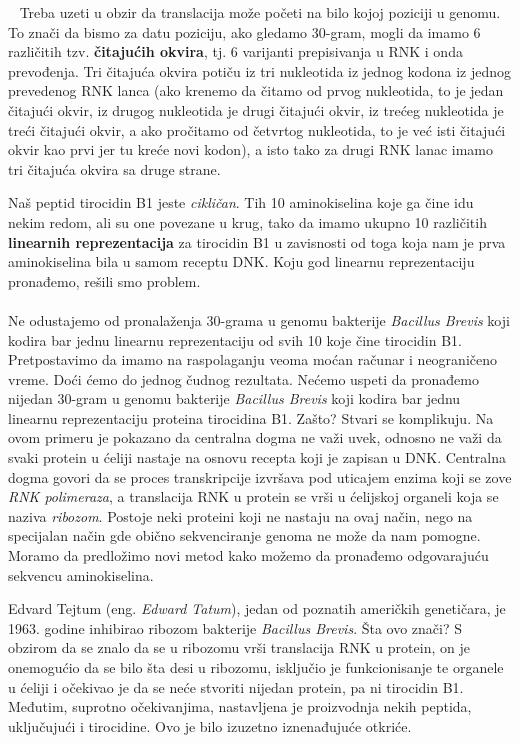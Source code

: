 ~ 
Treba uzeti u obzir da translacija može početi na bilo kojoj poziciji u genomu. To znači da bismo za datu poziciju, ako gledamo $30$-gram, mogli da imamo 6 različitih tzv. \textbf{čitajućih okvira}, tj. 6 varijanti prepisivanja u RNK i onda prevođenja. Tri čitajuća okvira potiču iz tri nukleotida iz jednog kodona iz jednog prevedenog RNK lanca (ako krenemo da čitamo od prvog nukleotida, to je jedan čitajući okvir, iz drugog nukleotida je drugi čitajući okvir, iz trećeg nukleotida je treći čitajući okvir, a ako pročitamo od četvrtog nukleotida, to je već isti čitajući okvir kao prvi jer tu kreće novi kodon), a isto tako za drugi RNK lanac imamo tri čitajuća okvira sa druge strane. 

Naš peptid tirocidin B1 jeste \textit{cikličan}. Tih 10 aminokiselina koje ga čine idu nekim redom, ali su one povezane u krug, tako da imamo ukupno 10 različitih \textbf{linearnih reprezentacija} za tirocidin B1 u zavisnosti od toga koja nam je prva aminokiselina bila u samom receptu DNK. Koju god linearnu reprezentaciju pronađemo, rešili smo problem. 
\\\\
\indent Ne odustajemo od pronalaženja $30$-grama u genomu bakterije \textit{Bacillus Brevis} koji kodira bar jednu linearnu reprezentaciju od svih 10 koje čine tirocidin B1. Pretpostavimo da imamo na raspolaganju veoma moćan računar i neograničeno vreme. Doći ćemo do jednog čudnog rezultata. Nećemo uspeti da pronađemo nijedan $30$-gram u genomu bakterije \textit{Bacillus Brevis} koji kodira bar jednu linearnu reprezentaciju proteina tirocidina B1. Zašto? Stvari se komplikuju. Na ovom primeru je pokazano da centralna dogma ne važi uvek, odnosno ne važi da svaki protein u ćeliji nastaje na osnovu recepta koji je zapisan u DNK. Centralna dogma govori da se proces transkripcije izvršava pod uticajem enzima koji se zove \textit{RNK polimeraza}, a translacija RNK u protein se vrši u ćelijskoj organeli koja se naziva \textit{ribozom}. Postoje neki proteini koji ne nastaju na ovaj način, nego na specijalan način gde obično sekvenciranje genoma ne može da nam pomogne. Moramo da predložimo novi metod kako možemo da pronađemo odgovarajuću sekvencu aminokiselina. 

Edvard Tejtum (eng. \textit{Edward Tatum}), jedan od poznatih američkih genetičara, je 1963. godine inhibirao ribozom bakterije \textit{Bacillus Brevis}. Šta ovo znači? S obzirom da se znalo da se u ribozomu vrši translacija RNK u protein, on je onemogućio da se bilo šta desi u ribozomu, isključio je funkcionisanje te organele u ćeliji i očekivao je da se neće stvoriti nijedan protein, pa ni tirocidin B1. Međutim, suprotno očekivanjima, nastavljena je proizvodnja nekih peptida, uključujući i tirocidine. Ovo je bilo izuzetno iznenađujuće otkriće.

